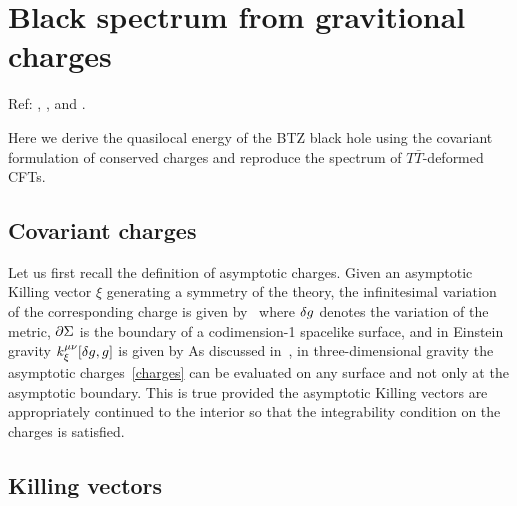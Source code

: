 \documentclass[11pt,a4paper,utf8]{article}
\begin{document}
	
\pagebreak

\section{Black spectrum from gravitional charges}
	Ref: \textcite{Wald:1993nt,Iyer:1994ys,Iyer:1995kg}, \textcite{Lewkowycz:2013nqa}, and \textcite{Faulkner:2013ana}.
	
	Here we derive the quasilocal energy of the BTZ black hole using the covariant formulation of conserved charges and reproduce the spectrum of $T\bar{T}$-deformed CFTs. 
	
\subsection{Covariant charges}
	
	Let us first recall the definition of asymptotic charges. Given an asymptotic Killing vector $\xi$ generating a symmetry of the theory, the infinitesimal variation of the corresponding charge is given by~\cite{Barnich:2001jy}
	where $\delta g$ denotes the variation of the metric, $\partial \Sigma$ is the boundary of a codimension-1 spacelike surface, and  in Einstein gravity $k_\xi^{\mu\nu} [\delta g, g]$ is given by
	As discussed in~\cite{Compere:2015knw}, in three-dimensional gravity the asymptotic charges~\eqref{charges} can be evaluated on any surface and not only at the asymptotic boundary. This is true provided the asymptotic Killing vectors are appropriately continued to the interior so that the integrability condition on the charges is satisfied. 
	
\subsection{Killing vectors}
	
\end{document}
